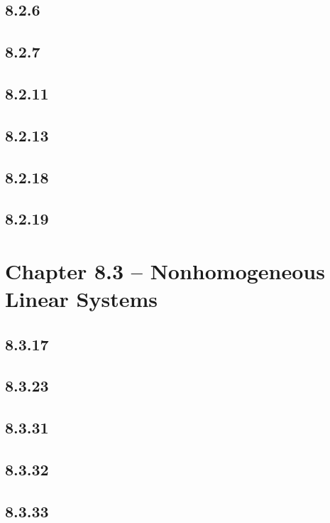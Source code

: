 \documentclass{article}
\begin{document}
\subsection{8.2.6}
\subsection{8.2.7}
\subsection{8.2.11}
\subsection{8.2.13}
\subsection{8.2.18}
\subsection{8.2.19}

\section{Chapter 8.3 -- Nonhomogeneous Linear Systems}

\subsection{8.3.17}
\subsection{8.3.23}
\subsection{8.3.31}
\subsection{8.3.32}
\subsection{8.3.33}
\end{document}
